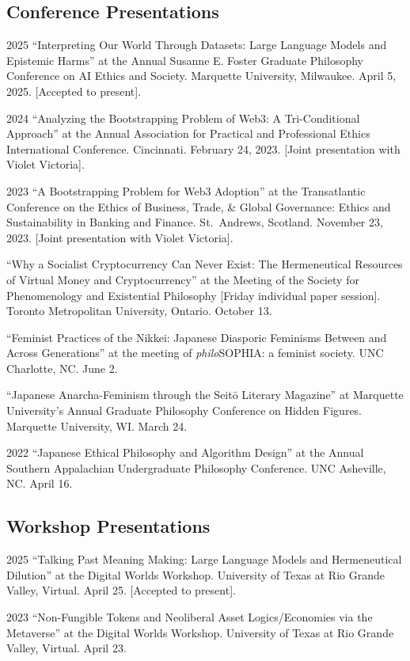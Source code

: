 \documentclass{article}
\begin{document}
\subsection*{\normalsize{Conference Presentations}}
\begin{tablist}
    \item[2025] \tab{}\enquote{Interpreting Our World Through Datasets: Large Language Models and Epistemic Harms} at the  Annual Susanne E. Foster Graduate Philosophy Conference on AI Ethics and Society. Marquette University, Milwaukee. April 5, 2025. [Accepted to present].
    \item[2024] \tab{}\enquote{Analyzing the Bootstrapping Problem of Web3: A Tri-Conditional Approach} at the  Annual Association for Practical and Professional Ethics International Conference. Cincinnati. February 24, 2023. [Joint presentation with Violet Victoria].
    \item[2023] \tab{}\enquote{A Bootstrapping Problem for Web3 Adoption} at the  Transatlantic Conference on the Ethics of Business, Trade, \& Global Governance: Ethics and Sustainability in Banking and Finance. St.~Andrews, Scotland. November 23, 2023. [Joint presentation with Violet Victoria].
    \item[] \tab{}\enquote{Why a Socialist Cryptocurrency Can Never Exist: The Hermeneutical Resources of Virtual Money and Cryptocurrency} at the  Meeting of the Society for Phenomenology and Existential Philosophy [Friday individual paper session]. Toronto Metropolitan University, Ontario. October 13.
    \item[] \tab{}\enquote{Feminist Practices of the Nikkei: Japanese Diasporic Feminisms Between and Across Generations} at the  meeting of \textit{philo}SOPHIA: a feminist society. UNC Charlotte, NC. June 2.
    \item[] \tab{}\enquote{Japanese Anarcha-Feminism through the Seitō Literary Magazine} at Marquette University's Annual Graduate Philosophy Conference on Hidden Figures. Marquette University, WI. March 24.
    \item[2022] \tab{}\enquote{Japanese Ethical Philosophy and Algorithm Design} at the  Annual Southern Appalachian Undergraduate Philosophy Conference. UNC Asheville, NC. April 16.
\end{tablist}

\subsection*{\normalsize{Workshop Presentations}}
\begin{tablist}
    \item[2025] \tab{}\enquote{Talking Past Meaning Making: Large Language Models and Hermeneutical Dilution} at the Digital Worlds Workshop. University of Texas at Rio Grande Valley, Virtual. April 25. [Accepted to present].
    \item[2023] \tab{}\enquote{Non-Fungible Tokens and Neoliberal Asset Logics/Economies via the Metaverse} at the Digital Worlds Workshop. University of Texas at Rio Grande Valley, Virtual. April 23.
\end{tablist}
\end{document}
